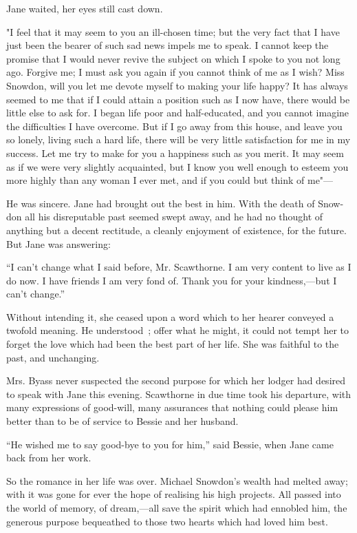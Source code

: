 Jane waited, her eyes still cast down.

"I feel that it may seem to you an ill-chosen time; but the very fact
that I have just been the bearer of such sad news impels me to speak. I
cannot keep the promise that I would never revive the subject on which I
spoke to you not long ago. Forgive me; I must ask you again if you
cannot think of me as I wish? Miss Snowdon, will you let me devote
myself to making your life happy? It has always seemed to me that if I
could attain a position such as I now have, there would be little else
to ask for. I began life poor and half-educated, and you cannot imagine
the difficulties I have overcome. But if I go away from this house, and
leave you so lonely, living such a hard life, there will be very
{\protect\hypertarget{307}{}{}} little satisfaction for me in my
success. Let me try to make for you a happiness such as you merit. It
may seem as if we were very slightly acquainted, but I know you well
enough to esteem you more highly than any woman I ever met, and if you
could but think of me"---

He was sincere. Jane had brought out the best in him. With the death of
Snow- don all his disreputable past seemed swept away, and he had no
thought of anything but a decent rectitude, a cleanly enjoyment of
existence, for the future. But Jane was answering:

``I can't change what I said before, Mr. Scawthorne. I am very content
to live as I do now. I have friends I am very fond of. Thank you for
your kindness,---but I can't change.''

Without intending it, she ceased upon a word which to her hearer
conveyed a twofold meaning. He understood~; offer what he might, it
could not tempt her to forget the love which had been the best part of
her life. She was faithful to the past, and unchanging.

Mrs. Byass never suspected the second purpose for which her lodger had
desired to speak {\protect\hypertarget{308}{}{}} with Jane this evening.
Scawthorne in due time took his departure, with many expressions of
good-will, many assurances that nothing could please him better than to
be of service to Bessie and her husband.

``He wished me to say good-bye to you for him,'' said Bessie, when Jane
came back from her work.

So the romance in her life was over. Michael Snowdon's wealth had melted
away; with it was gone for ever the hope of realising his high projects.
All passed into the world of memory, of dream,---all save the spirit
which had ennobled him, the generous purpose bequeathed to those two
hearts which had loved him best.

